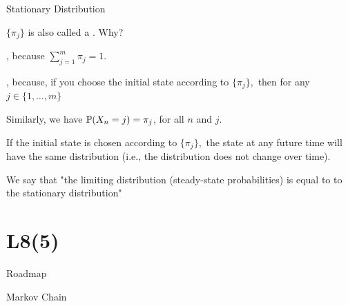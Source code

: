 \begin{frame}{Stationary Distribution}

\plitemsep 0.1in
\bci

\item<2-> $\{ \pi_j \}$ is also called a . Why?

\item<3-> , because $\sum_{j=1}^m \pi_j =1.$

\item<4-> , because, if you choose the initial state
  according to $\{\pi_j \},$ then for any $j \in \{1, \ldots, m \}$ 

\bci
\item<7-> Similarly, we have $\mathbb{P}( X_n = j ) = \pi_j$, for all $n$ and $j.$

\item<8-> If the initial state is chosen according to $\{\pi_j \},$ the state at any future time will have the same distribution (i.e., the distribution does not change over time). 

\eci

\item<9-> We say that "the limiting distribution (steady-state
  probabilities) is equal to to the stationary distribution"

\eci


\end{frame}


\section{L8(5)}
\begin{frame}{Roadmap}

{\Large Markov Chain}


  \plitemsep 0.1in

\bce[(1)]



\item {}

\item {}

\item {}

\item {}

\item {}

\ece 

\end{frame}


